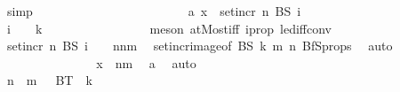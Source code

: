 \begin{isabellebody}
\ simp\isanewline
\ \ \ \ \ \ \ \ \ \ \isamarkupfalse%
\isanewline
\ \ \ \ \ \ \ \ \ \ \ \ \isamarkupfalse%
\ a{\isacharcolon}{\kern0pt}\ {\isachardoublequoteopen}x\ {\isasymin}\ set{\isacharunderscore}{\kern0pt}incr\ n\ {\isacharparenleft}{\kern0pt}BS\ {\isacharparenleft}{\kern0pt}i\ {\isacharminus}{\kern0pt}\ {}{\isacharparenright}{\kern0pt}{\isacharparenright}{\kern0pt}{\isachardoublequoteclose}\isanewline
\ \ \ \ \ \ \ \ \ \ \ \ \isamarkupfalse%
\ \isamarkupfalse%
\ {\isachardoublequoteopen}i\ {\isacharminus}{\kern0pt}\ {}\ {\isasymle}\ k{\isachardoublequoteclose}\ \isanewline
\ \ \ \ \ \ \ \ \ \ \ \ \ \ \isamarkupfalse%
\ {\isacharparenleft}{\kern0pt}meson\ atMost{\isacharunderscore}{\kern0pt}iff\ i{\isacharunderscore}{\kern0pt}prop\ le{\isacharunderscore}{\kern0pt}diff{\isacharunderscore}{\kern0pt}conv{\isacharparenright}{\kern0pt}\ \isanewline
\ \ \ \ \ \ \ \ \ \ \ \ \isamarkupfalse%
\ \isamarkupfalse%
\ {\isachardoublequoteopen}set{\isacharunderscore}{\kern0pt}incr\ n\ {\isacharparenleft}{\kern0pt}BS\ {\isacharparenleft}{\kern0pt}i\ {\isacharminus}{\kern0pt}\ {}{\isacharparenright}{\kern0pt}{\isacharparenright}{\kern0pt}\ {\isasymsubseteq}\ {\isacharbraceleft}{\kern0pt}n{\isachardot}{\kern0pt}{\isachardot}{\kern0pt}{\isacharless}{\kern0pt}n{\isacharplus}{\kern0pt}m{\isacharbraceright}{\kern0pt}{\isachardoublequoteclose}\ \isamarkupfalse%
\ set{\isacharunderscore}{\kern0pt}incr{\isacharunderscore}{\kern0pt}image{\isacharbrackleft}{\kern0pt}of\ BS\ k\ m\ n{\isacharbrackright}{\kern0pt}\ BfS{\isacharunderscore}{\kern0pt}props\ \isamarkupfalse%
\ auto\isanewline
\ \ \ \ \ \ \ \ \ \ \ \ \isamarkupfalse%
\ \isamarkupfalse%
\ {\isachardoublequoteopen}x\ {\isasymin}\ {\isacharbraceleft}{\kern0pt}{\isachardot}{\kern0pt}{\isachardot}{\kern0pt}{\isacharless}{\kern0pt}n{\isacharplus}{\kern0pt}m{\isacharbraceright}{\kern0pt}{\isachardoublequoteclose}\ \isamarkupfalse%
\ a\ \isamarkupfalse%
\ auto\isanewline
\ \ \ \ \ \ \ \ \ \ \isamarkupfalse%
\isanewline
\ \ \ \ \ \ \ \ \isamarkupfalse%
\isanewline
\ \ \ \ \ \ \isamarkupfalse%
\isanewline
\ \ \ \ \isamarkupfalse%
\isanewline
\ \ \ \ \ \ \isamarkupfalse%
\ {\isachardoublequoteopen}{\isacharbraceleft}{\kern0pt}{\isachardot}{\kern0pt}{\isachardot}{\kern0pt}{\isacharless}{\kern0pt}n\ {\isacharplus}{\kern0pt}\ m{\isacharbraceright}{\kern0pt}\ {\isasymsubseteq}\ {\isasymUnion}\ {\isacharparenleft}{\kern0pt}BT\ {\isacharbackquote}{\kern0pt}\ {\isacharbraceleft}{\kern0pt}{\isachardot}{\kern0pt}{\isachardot}{\kern0pt}k\ {\isacharplus}{\kern0pt}\ {}{\isacharbraceright}{\kern0pt}{\isacharparenright}{\kern0pt}{\isachardoublequoteclose}\isanewline

\end{isabellebody}
